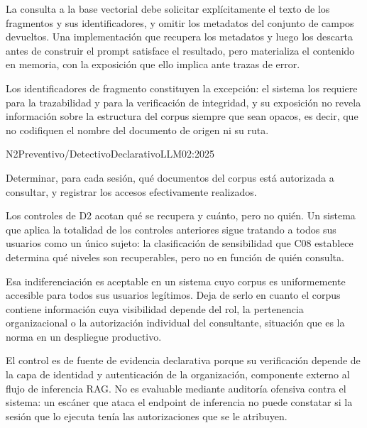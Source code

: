 La consulta a la base vectorial debe solicitar explícitamente el texto de los fragmentos y sus identificadores, y omitir los metadatos del conjunto de campos devueltos. Una implementación que recupera los metadatos y luego los descarta antes de construir el prompt satisface el resultado, pero materializa el contenido en memoria, con la exposición que ello implica ante trazas de error.

Los identificadores de fragmento constituyen la excepción: el sistema los requiere para la trazabilidad y para la verificación de integridad, y su exposición no revela información sobre la estructura del corpus siempre que sean opacos, es decir, que no codifiquen el nombre del documento de origen ni su ruta.


  {N2}{Preventivo/Detectivo}{Declarativo}{LLM02:2025}

Determinar, para cada sesión, qué documentos del corpus está autorizada a consultar, y registrar los accesos efectivamente realizados.

Los controles de D2 acotan qué se recupera y cuánto, pero no quién. Un sistema que aplica la totalidad de los controles anteriores sigue tratando a todos sus usuarios como un único sujeto: la clasificación de sensibilidad que C08 establece determina qué niveles son recuperables, pero no en función de quién consulta.

Esa indiferenciación es aceptable en un sistema cuyo corpus es uniformemente accesible para todos sus usuarios legítimos. Deja de serlo en cuanto el corpus contiene información cuya visibilidad depende del rol, la pertenencia organizacional o la autorización individual del consultante, situación que es la norma en un despliegue productivo.

El control es de fuente de evidencia declarativa porque su verificación depende de la capa de identidad y autenticación de la organización, componente externo al flujo de inferencia RAG. No es evaluable mediante auditoría ofensiva contra el sistema: un escáner que ataca el endpoint de inferencia no puede constatar si la sesión que lo ejecuta tenía las autorizaciones que se le atribuyen.

